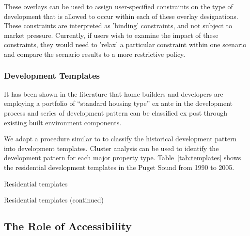 These overlays can be used to assign user-specified constraints on
the type of development that is allowed to occur within each of
these overlay designations.  These constraints are interpreted as
'binding' constraints, and not subject to
market pressure.  Currently, if users wish to examine the impact of
these constraints, they would need to 'relax' a particular
constraint within one scenario and compare the scenario results to
a more restrictive policy.

\subsubsection{Development Templates}
It has been shown in the literature that home builders and
developers are employing a portfolio of ``standard housing
type'' ex ante in the development process and series of
development pattern can be classified ex post through
existing built environment components\cite{Song2007}. 

We adapt a procedure similar to \cite{Song2007} to classify
the historical development pattern into development
templates.  Cluster analysis can be used to identify the
development pattern for each major property type.
Table~\ref{tab:templates} shows the residential development
templates in the Puget Sound from 1990 to 2005.

\begin{landscape}
\begin{table}[h]
\label{tab:templates}
\begin{center}
  \caption{Residential templates}

\end{center}
\end{table}
\end{landscape}

\begin{landscape}
\begin{table}[h]
\begin{center}
  \caption{Residential templates (continued)}

\end{center}
\end{table}
\end{landscape}


\subsection{The Role of Accessibility}

